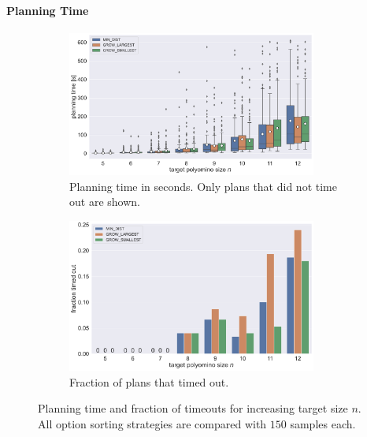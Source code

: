 \paragraph{Planning Time}

\begin{figure}
	\centering
	\begin{subfigure}[b]{\textwidth}
		\centering
		\includegraphics[width=0.9\textwidth]{figures/plots/AFN_time.pdf}
		\caption{Planning time in seconds. Only plans that did not time out are shown.}
		\label{fig:AFN_time}
	\end{subfigure}

	\begin{subfigure}[b]{\textwidth}
		\centering
		\includegraphics[width=0.9\textwidth]{figures/plots/AFN_timeout.pdf}
		\caption{Fraction of plans that timed out.}
		\label{fig:AFN_timeout}
	\end{subfigure}
	\caption[Planning time and fraction of timeouts for increasing target size]{Planning time and fraction of timeouts for increasing target size $n$. All option sorting strategies are compared with $150$ samples each.}
	\label{fig:AFN_timestats}
\end{figure}

